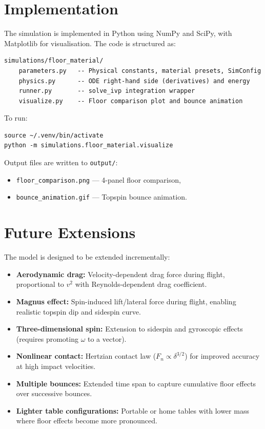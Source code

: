 \documentclass[11pt,a4paper]{article}
\begin{document}
\section{Implementation}

The simulation is implemented in Python using NumPy and SciPy, with
Matplotlib for visualisation. The code is structured as:

\begin{verbatim}
simulations/floor_material/
    parameters.py   -- Physical constants, material presets, SimConfig
    physics.py      -- ODE right-hand side (derivatives) and energy
    runner.py       -- solve_ivp integration wrapper
    visualize.py    -- Floor comparison plot and bounce animation
\end{verbatim}

To run:
\begin{verbatim}
source ~/.venv/bin/activate
python -m simulations.floor_material.visualize
\end{verbatim}

Output files are written to \texttt{output/}:
\begin{itemize}[nosep]
  \item \texttt{floor\_comparison.png} --- 4-panel floor comparison,
  \item \texttt{bounce\_animation.gif} --- Topspin bounce animation.
\end{itemize}

\section{Future Extensions}

The model is designed to be extended incrementally:
\begin{itemize}[nosep]
  \item \textbf{Aerodynamic drag:} Velocity-dependent drag force during flight,
    proportional to $v^2$ with Reynolds-dependent drag coefficient.
  \item \textbf{Magnus effect:} Spin-induced lift/lateral force during flight,
    enabling realistic topspin dip and sidespin curve.
  \item \textbf{Three-dimensional spin:} Extension to sidespin and gyroscopic
    effects (requires promoting $\omega$ to a vector).
  \item \textbf{Nonlinear contact:} Hertzian contact law
    ($F_n \propto \delta^{3/2}$) for improved accuracy at high impact
    velocities.
  \item \textbf{Multiple bounces:} Extended time span to capture cumulative
    floor effects over successive bounces.
  \item \textbf{Lighter table configurations:} Portable or home tables with
    lower mass where floor effects become more pronounced.
\end{itemize}
\end{document}
